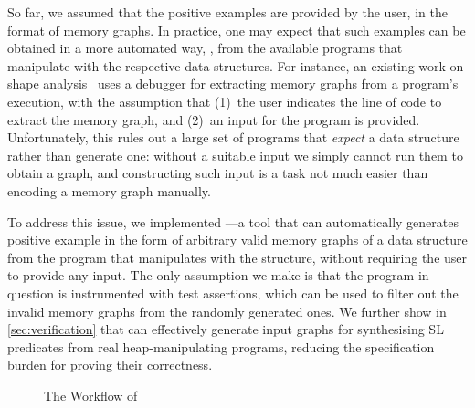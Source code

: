 So far, we assumed that the positive examples are provided by the
user, in the format of memory graphs. 
%
In practice, one may expect that such examples can be obtained in a
more automated way, \eg, from the available programs that manipulate
with the respective data structures.
%
For instance, an existing work on shape analysis~\cite{le2019sling} uses
a debugger for extracting memory graphs from a program's execution,
with the assumption that (1)~the user indicates the line of code to
extract the memory graph, and (2)~an input for the program is provided.
%
Unfortunately, this rules out a large set of programs that
\emph{expect} a data structure rather than generate one: without a
suitable input we simply cannot run them to obtain a graph, and constructing
such input is a task not much easier than encoding a memory graph manually.


To address this issue, we implemented \ggen---a tool that can
automatically generates positive example in the form of arbitrary valid
memory graphs of a data structure from the program that manipulates
with the structure, without requiring the user to provide any input.
%
The only assumption we make is that the program in question is
instrumented with test assertions, which can be used to filter out the
invalid memory graphs from the randomly generated ones. We further
show in \autoref{sec:verification} that \ggen can effectively generate
input graphs for synthesising SL predicates from real
heap-manipulating programs, reducing the specification burden for
proving their correctness.



\begin{figure}[!t]
  \centering
      
      \begin{adjustbox}{width=0.96\textwidth}
        
      \end{adjustbox}
      \caption{The Workflow of \tool}
      
    \label{fig:extended}
\end{figure}



